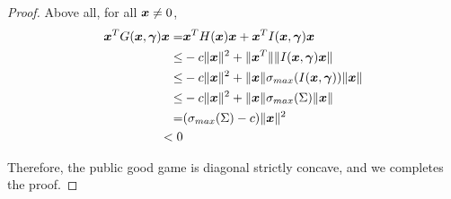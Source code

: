 \begin{proof}
Above all, for all ${\bm{x}} \ne 0$,
\begin{align*}
    {\bm{x}}^T G({\bm{x}}, \bm{\gamma}) {\bm{x}}
    =& {\bm{x}}^T H({\bm{x}}) {\bm{x}} + {\bm{x}}^T I({\bm{x}}, \bm{\gamma}) {\bm{x}}
    \\
    \le& -c \| {\bm{x}} \|^2 + \| {\bm{x}}^T \| \| I({\bm{x}}, \bm{\gamma}) {\bm{x}} \|
    \\
    \le& -c \| {\bm{x}} \|^2 + \| {\bm{x}} \| \sigma_{max}(I({\bm{x}}, \bm{\gamma})) \| {\bm{x}} \|
    \\
    \le& -c \| {\bm{x}} \|^2 + \| {\bm{x}} \| \sigma_{max}(\Sigma) \| {\bm{x}} \|
    \\
    =& (\sigma_{max}(\Sigma) - c) \| {\bm{x}} \|^2
    \\
    < 0
\end{align*}

Therefore, the public good game is diagonal strictly concave, and we completes the proof.

    
\end{proof}
